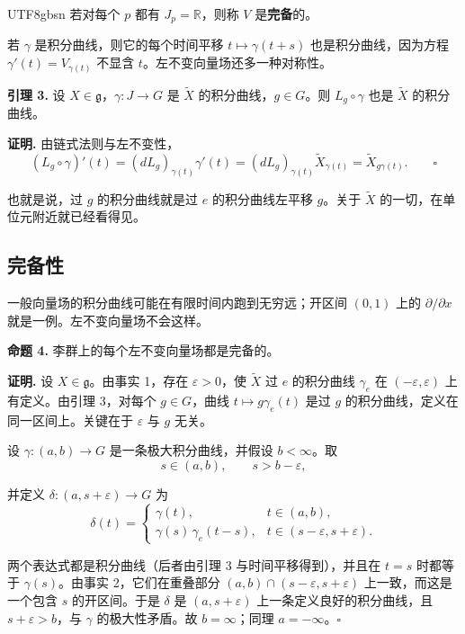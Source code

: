 \documentclass[11pt]{article}
\begin{document}
\begin{CJK*}{UTF8}{gbsn}
若对每个 $p$ 都有 $J_p = \mathbb{R}$，则称 $V$ 是\textbf{完备}的。

若 $\gamma$ 是积分曲线，则它的每个时间平移 $t \mapsto \gamma(t + s)$ 也是积分曲线，因为方程 $\gamma'(t) = V_{\gamma(t)}$ 不显含 $t$。左不变向量场还多一种对称性。

\textbf{引理 3.} 设 $X \in \mathfrak{g}$，$\gamma : J \to G$ 是 $\widetilde{X}$ 的积分曲线，$g \in G$。则 $L_g \circ \gamma$ 也是 $\widetilde{X}$ 的积分曲线。

\textbf{证明.} 由链式法则与左不变性，
\[
(L_g \circ \gamma)'(t) = (dL_g)_{\gamma(t)} \gamma'(t) = (dL_g)_{\gamma(t)} \widetilde{X}_{\gamma(t)} = \widetilde{X}_{g\gamma(t)}. \qquad \square
\]

也就是说，过 $g$ 的积分曲线就是过 $e$ 的积分曲线左平移 $g$。关于 $\widetilde{X}$ 的一切，在单位元附近就已经看得见。

\subsection{完备性}

一般向量场的积分曲线可能在有限时间内跑到无穷远；开区间 $(0, 1)$ 上的 $\partial/\partial x$ 就是一例。左不变向量场不会这样。

\textbf{命题 4.} 李群上的每个左不变向量场都是完备的。

\textbf{证明.} 设 $X \in \mathfrak{g}$。由事实 1，存在 $\varepsilon > 0$，使 $\widetilde{X}$ 过 $e$ 的积分曲线 $\gamma_e$ 在 $(-\varepsilon, \varepsilon)$ 上有定义。由引理 3，对每个 $g \in G$，曲线 $t \mapsto g\gamma_e(t)$ 是过 $g$ 的积分曲线，定义在同一区间上。关键在于 $\varepsilon$ 与 $g$ 无关。

设 $\gamma : (a, b) \to G$ 是一条极大积分曲线，并假设 $b < \infty$。取
\[
s \in (a, b), \qquad s > b - \varepsilon,
\]

并定义 $\delta : (a, s + \varepsilon) \to G$ 为
\[
\delta(t) =
\begin{cases}
\gamma(t), & t \in (a, b), \\
\gamma(s)\, \gamma_e(t - s), & t \in (s - \varepsilon, s + \varepsilon).
\end{cases}
\]

两个表达式都是积分曲线（后者由引理 3 与时间平移得到），并且在 $t = s$ 时都等于 $\gamma(s)$。由事实 2，它们在重叠部分 $(a, b) \cap (s - \varepsilon, s + \varepsilon)$ 上一致，而这是一个包含 $s$ 的开区间。于是 $\delta$ 是 $(a, s + \varepsilon)$ 上一条定义良好的积分曲线，且 $s + \varepsilon > b$，与 $\gamma$ 的极大性矛盾。故 $b = \infty$；同理 $a = -\infty$。$\square$


\end{CJK*}
\end{document}
